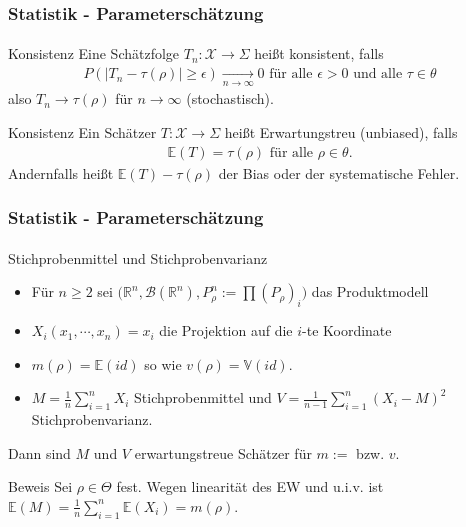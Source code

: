 \documentclass{beamer}
\begin{document}
\begin{frame}
    \frametitle{Statistik - Parameterschätzung}
\framesubtitle{}

\begin{block}{Konsistenz}
Eine Schätzfolge $T_n: \mathcal{X} \to \Sigma$  heißt konsistent, falls
\begin{align*}
P( |T_n - \tau(\rho)  |  \geq \epsilon)  \underset {n \to \infty}{\longrightarrow} 0 \text{ für alle } \epsilon > 0 \text { und alle } \tau \in \theta  
\end{align*}
also $T_n \to \tau(\rho)$ für $n \to \infty$  (stochastisch).
\end{block}
\begin{block}{Konsistenz}
Ein Schätzer $T: \mathcal{X} \to \Sigma$  heißt Erwartungstreu (unbiased), falls
\begin{align*}
\mathbb{E}(T) = \tau(\rho) \text{ für alle } \rho \in \theta.
\end{align*}
Andernfalls heißt $\mathbb{E}(T) - \tau(\rho) $ der Bias oder der systematische Fehler.
\end{block}
 \end{frame}

\begin{frame}
    \frametitle{Statistik - Parameterschätzung}
\framesubtitle{}
\begin{block}{Stichprobenmittel und  Stichprobenvarianz}
\begin{itemize}
\item Für $n \geq 2$ sei  $\biggl ( \mathbb{R}^n, \mathcal{B}(\mathbb{R}^n ), P^n_\rho :=  \prod (P_\rho)_i \biggr)$ das Produktmodell
\item $X_i(x_1, \cdots , x_n) = x_i$ die Projektion auf die $i$-te Koordinate  
\item $m(\rho) =  \mathbb{E}(id) $ so wie $v(\rho) =\mathbb{V}(id)$. 
\item  $M= \frac{1}{n} \sum_{i=1}^n X_i$ Stichprobenmittel  und $V= \frac{1}{n-1} \sum_{i=1}^n (X_i - M)^2$ Stichprobenvarianz.
\end{itemize}

 Dann sind $M$  und $V$ erwartungstreue Schätzer für $m:=$ bzw. $v$.

\end{block}

\begin{block}{Beweis}
Sei $\rho \in \Theta$ fest. Wegen linearität des EW und u.i.v. ist $\mathbb{E}(M) =\frac{1}{n} \sum_{i=1}^n \mathbb{E}(X_i) = m(\rho) $.
\end{block}


 \end{frame}
\end{document}
